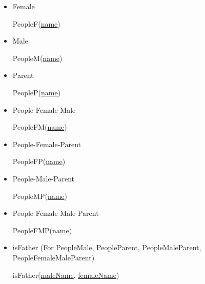 \documentclass[12pt]{article}
\begin{document}
\begin{enumerate}[1.]
\begin{enumerate}[a)]
\begin{itemize}
            \bigskip
            \item Female

            \bigskip

            \quad PeopleF(\underline{name})

            \bigskip

            \item Male

            \bigskip

            \quad PeopleM(\underline{name})

            \bigskip

            \item Parent

            \bigskip

            \quad PeopleP(\underline{name})

            \bigskip

            \item People-Female-Male

            \bigskip

            \quad PeopleFM(\underline{name})

            \bigskip

            \item People-Female-Parent

            \bigskip

            \quad PeopleFP(\underline{name})

            \bigskip

            \item People-Male-Parent

            \bigskip

            \quad PeopleMP(\underline{name})

            \bigskip

            \item People-Female-Male-Parent

            \bigskip

            \quad PeopleFMP(\underline{name})

            \bigskip

            \item isFather (For PeopleMale, PeopleParent, PeopleMaleParent,\\ PeopleFemaleMaleParent)

            \bigskip

            \quad isFather(\underline{maleName}, \underline{femaleName})


\end{itemize}
\end{enumerate}
\end{enumerate}
\end{document}
